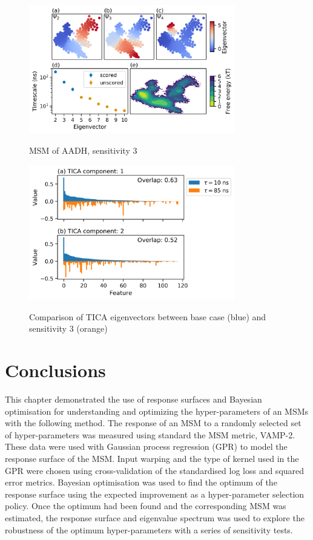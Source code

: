 \begin{figure}
    \centering
    \caption{MSM of AADH, sensitivity 3}
    \includegraphics[width=0.8\textwidth]{chapters/msm_optimization/figures/aadh_msm_sens_3.png}
    \label{fig:aadh_msm_sens_3}
\end{figure}
\begin{figure}
    \centering
    \caption{Comparison of TICA eigenvectors between base case (blue) and sensitivity 3 (orange)}
    \includegraphics[width=0.8\textwidth]{chapters/msm_optimization/figures/aadh_msm_sens_3_tica.png}
    \label{fig:aadh_msm_sens_3_tica}
\end{figure}


\section{Conclusions}

This chapter demonstrated the use of response surfaces and Bayesian optimisation for understanding and optimizing the hyper-parameters of an MSMs with the following method. The response of an MSM to a randomly selected set of hyper-parameters was measured using standard the MSM metric, VAMP-2. These data were used with Gaussian process regression (GPR) to model the response surface of the MSM. Input warping and the type of kernel used in the  GPR were chosen using cross-validation of the standardised log loss and squared error metrics.  Bayesian optimisation was used to find the optimum of the response surface using the expected improvement as a hyper-parameter selection policy. Once the optimum had been found and the corresponding MSM was estimated, the response surface and eigenvalue spectrum was used to explore the robustness of the optimum hyper-parameters with a series of sensitivity tests. 

